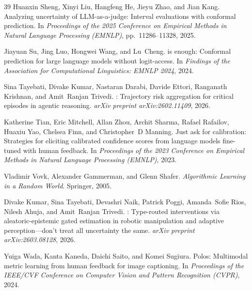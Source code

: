 \documentclass{article}
\begin{document}
\begin{thebibliography}{39}
Huanxin Sheng, Xinyi Liu, Hangfeng He, Jieyu Zhao, and Jian Kang.
\newblock Analyzing uncertainty of {LLM}-as-a-judge: Interval evaluations with conformal prediction.
\newblock In \emph{Proceedings of the 2025 Conference on Empirical Methods in Natural Language Processing (EMNLP)}, pp.\  11286--11328, 2025.

Jiayuan Su, Jing Luo, Hongwei Wang, and Lu~Cheng.
 is enough: Conformal prediction for large language models without logit-access.
\newblock In \emph{Findings of the Association for Computational Linguistics: EMNLP 2024}, 2024.

Sina Tayebati, Divake Kumar, Nastaran Darabi, Davide Ettori, Ranganath Krishnan, and Amit~Ranjan Trivedi.
: Trajectory risk aggregation for critical episodes in agentic reasoning.
\newblock \emph{arXiv preprint arXiv:2602.11409}, 2026.

Katherine Tian, Eric Mitchell, Allan Zhou, Archit Sharma, Rafael Rafailov, Huaxiu Yao, Chelsea Finn, and Christopher~D Manning.
\newblock Just ask for calibration: Strategies for eliciting calibrated confidence scores from language models fine-tuned with human feedback.
\newblock In \emph{Proceedings of the 2023 Conference on Empirical Methods in Natural Language Processing (EMNLP)}, 2023.

Vladimir Vovk, Alexander Gammerman, and Glenn Shafer.
\newblock \emph{Algorithmic Learning in a Random World}.
\newblock Springer, 2005.

Divake Kumar, Sina Tayebati, Devashri Naik, Patrick Poggi, Amanda~Sofie Rios, Nilesh Ahuja, and Amit~Ranjan Trivedi.
: Type-routed interventions via aleatoric-epistemic gated estimation in robotic manipulation and adaptive perception---don't treat all uncertainty the same.
\newblock \emph{arXiv preprint arXiv:2603.08128}, 2026.

Yuiga Wada, Kanta Kaneda, Daichi Saito, and Komei Sugiura.
\newblock Polos: Multimodal metric learning from human feedback for image captioning.
\newblock In \emph{Proceedings of the IEEE/CVF Conference on Computer Vision and Pattern Recognition (CVPR)}, 2024.


\end{thebibliography}
\end{document}
